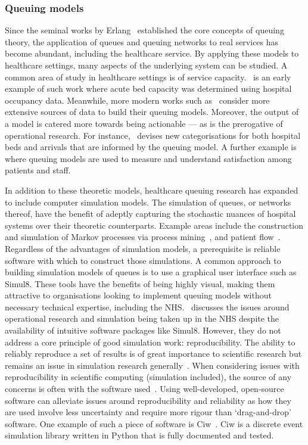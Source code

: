 \subsubsection{Queuing models}

Since the seminal works by Erlang~\cite{Erlang1917,Erlang1920} established the
core concepts of queuing theory, the application of queues and queuing networks
to real services has become abundant, including the healthcare service. By
applying these models to healthcare settings, many aspects of the underlying
system can be studied. A common area of study in healthcare settings is of
service capacity.~\cite{McClain1976} is an early example of such work where
acute bed capacity was determined using hospital occupancy data. Meanwhile, more
modern works such as~\cite{Palvannan2012,Pinto2014} consider more extensive
sources of data to build their queuing models.  Moreover, the output of a model
is catered more towards being actionable --- as is the prerogative of
operational research. For instance,~\cite{Pinto2014} devises new categorisations
for both hospital beds and arrivals that are informed by the queuing model. A
further example is~\cite{Komashie2015} where queuing models are used to measure
and understand satisfaction among patients and staff.

In addition to these theoretic models, healthcare queuing research has expanded
to include computer simulation models. The simulation of queues, or networks
thereof, have the benefit of adeptly capturing the stochastic nuances of
hospital systems over their theoretic counterparts. Example areas include the
construction and simulation of Markov processes via process
mining~\cite{Arnolds2018,Rebuge2012}, and patient flow~\cite{Bhattacharjee2014}.
Regardless of the advantages of simulation models, a prerequisite is reliable
software with which to construct those simulations. A common approach to
building simulation models of queues is to use a graphical user interface such
as Simul8. These tools have the benefits of being highly visual, making them
attractive to organisations looking to implement queuing models without
necessary technical expertise, including the NHS.~\cite{Brailsford2013}
discusses the issues around operational research and simulation being taken up
in the NHS despite the availability of intuitive software packages like Simul8.
However, they do not address a core principle of good simulation work:
reproducibility. The ability to reliably reproduce a set of results is of great
importance to scientific research but remains an issue in simulation research
generally~\cite{Fitzpatrick2019}. When considering issues with reproducibility
in scientific computing (simulation included), the source of any concerns is
often with the software used~\cite{Ivie2018}. Using well-developed, open-source
software can alleviate issues around reproducibility and reliability as how they
are used involve less uncertainty and require more rigour than ‘drag-and-drop’
software. One example of such a piece of software is Ciw~\cite{Palmer2019}. Ciw
is a discrete event simulation library written in Python that is fully
documented and tested. 

